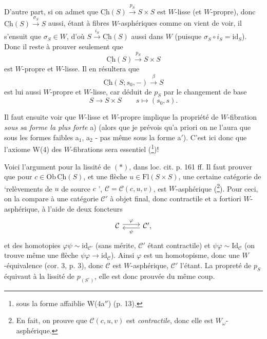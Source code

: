 \documentclass[11pt]{article}
\newcommand{\msp}[1]{\marginpar{\footnotesize [#1]}}
\newcommand{\Ch}{\underline{\mathrm{Ch}}}
\begin{document}
D'autre part, si on admet que $\Ch(S) \xrightarrow{p_S} S{\times}S$ est $W$-lisse (et $W$-propre), donc $\Ch(S) \xrightarrow{\sigma_S} S$ aussi, étant à fibres $W$-asphériques comme on vient de voir, il s'ensuit que $\sigma_S \in W$, d'où $S \xrightarrow{i_S} \Ch(S)$ aussi dans $W$ (puisque $\sigma_S \circ i_S = \mathrm{id}_S$). Donc il reste à prouver seulement que
\[ \Ch(S) \xrightarrow{p_S} S \times S \tag*{$(*)$} \]
est $W$-propre et $W$-lisse. Il en résultera que
\[ \Ch(S; s_0, -) \xrightarrow{\beta} S \]
est lui aussi $W$-propre et $W$-lisse, car déduit de $p_S$ par le changement de base
\[ S \longrightarrow S \times S \qquad s \longmapsto (s_0, s). \]

Il faut ensuite voir que $W$-lisse et $W$-propre implique la propriété de $W$-fibration \textit{sous sa forme la plus forte} a) (alors que je prévois qu'a priori on ne l'aura que sous les formes faibles a$_1$, a$_2$ - pas même sous la forme a$'$). C'est ici donc que l'axiome W(4) des $W$-fibrations sera essentiel (\footnote[15]{sous la forme affaiblie W(4a$''$) (p. 13).})!

Voici l'argument pour la lissité de $(*)$, dans loc. cit. p. 161 ff. Il faut prouver que pour $c \in \mathrm{Ob}\,\Ch(S)$, et une flèche $u \in \mathrm{Fl}(S \times S)$, une certaine catégorie de ‘relèvements de $u$ de source $c$ ’, $\mathcal{C} = \mathcal{C}(c,u,v)$, est $W$-asphérique (\footnote[16]{En fait, on prouve que $\mathcal{C}(c,u,v)$ est \textit{contractile}, donc elle est $W_\omega$-asphérique.}). Pour ceci, on la compare à une catégorie $\mathcal{C}'$ à objet final, donc contractile et a fortiori $W$-asphérique, à l'aide de deux foncteurs
\[ \begin{tikzcd} \mathcal{C} \arrow[r, shift left, "\varphi"] & \mathcal{C}', \arrow[l, shift left, "\psi"] \end{tikzcd} \]
et des homotopies $\varphi\psi \sim \mathrm{id}_{\mathcal{C}'}$ (sans mérite, $\mathcal{C}'$ étant contractile)
\msp{page 10}
et $\psi\varphi \sim \mathrm{Id}_{\mathcal{C}}$ (on trouve même une flèche $\psi\varphi \longrightarrow \mathrm{id}_{\mathcal{C}}$). Ainsi $\varphi$ est un homotopisme, donc une $W$-équivalence (cor. 3, p. 3), donc $\mathcal{C}$ est $W$-asphérique, $\mathcal{C}'$ l'étant. La propreté de $p_S$ équivaut à la lissité de $p_{(S^\circ)}$, elle est donc prouvée du même coup.
\end{document}
